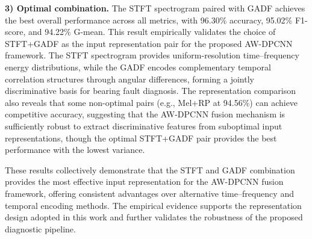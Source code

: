 \documentclass[journal]{IEEEtran}
\begin{document}
\textbf{3) Optimal combination.} The STFT spectrogram paired with GADF achieves the best overall performance across all metrics, with 96.30\% accuracy, 95.02\% F1-score, and 94.22\% G-mean. This result empirically validates the choice of STFT+GADF as the input representation pair for the proposed AW-DPCNN framework. The STFT spectrogram provides uniform-resolution time--frequency energy distributions, while the GADF encodes complementary temporal correlation structures through angular differences, forming a jointly discriminative basis for bearing fault diagnosis. The representation comparison also reveals that some non-optimal pairs (e.g., Mel+RP at 94.56\%) can achieve competitive accuracy, suggesting that the AW-DPCNN fusion mechanism is sufficiently robust to extract discriminative features from suboptimal input representations, though the optimal STFT+GADF pair provides the best performance with the lowest variance.

These results collectively demonstrate that the STFT and GADF combination provides the most effective input representation for the AW-DPCNN fusion framework, offering consistent advantages over alternative time--frequency and temporal encoding methods. The empirical evidence supports the representation design adopted in this work and further validates the robustness of the proposed diagnostic pipeline.



\end{document}
